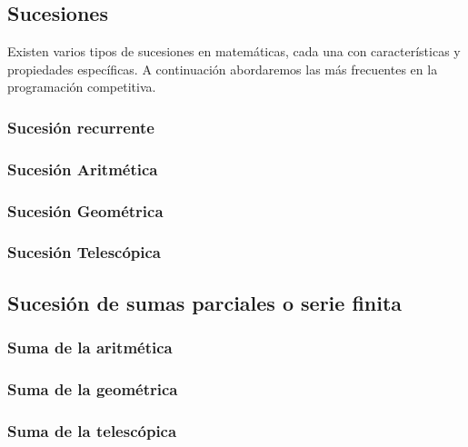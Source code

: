 \subsection{Sucesiones}
Existen varios tipos de sucesiones en matemáticas, cada una con características y propiedades específicas. A continuación abordaremos las más frecuentes en la programación competitiva.

\subsubsection{Sucesión recurrente}


\subsubsection{Sucesión Aritmética}


\subsubsection{Sucesión Geométrica}


\subsubsection{Sucesión Telescópica}


\subsection{Sucesión de sumas parciales o serie finita}


\subsubsection{Suma de la aritmética}


\subsubsection{Suma de la geométrica}


\subsubsection{Suma de la telescópica}



